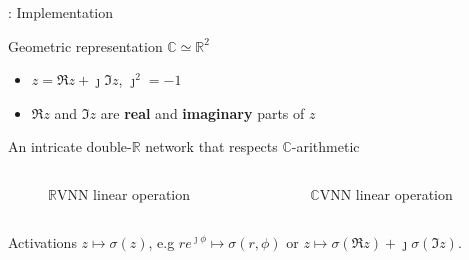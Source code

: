 \documentclass{beamer}
\newcommand{\real}{\mathbb{R}}
\newcommand{\cplx}{\mathbb{C}}
\newcommand{\iu}{{\jmath}}
\begin{document}
\begin{frame}[c]{\insertsection: Implementation}

  Geometric representation $\cplx \simeq \real^2$
  \begin{itemize}
    \item $z = \Re{z} + \iu \Im{z}$, $\iu^2 = -1$
    \item $\Re{z}$ and $\Im{z}$ are \textbf{real} and \textbf{imaginary} parts of $z$
  \end{itemize}

  \bigskip

  \bigskip
  An intricate double-$\real$ network that respects $\cplx$-arithmetic
  \vspace{-1em}
  \begin{columns}[T]
    \begin{column}{0.45\linewidth}
      \begin{figure}
          
        {$\real$VNN linear operation}
      \end{figure}
    \end{column}%
    \begin{column}{0.45\linewidth}
      \begin{figure}
          
        {$\cplx$VNN linear operation}
      \end{figure}
    \end{column}
  \end{columns}

  \bigskip

  \bigskip
  Activations $z \mapsto \sigma(z)$, e.g $
    r e^{\iu \phi} \mapsto \sigma(r, \phi)
  $ or $
    z \mapsto \sigma(\Re{z}) + \iu \sigma(\Im{z}) %
  $.


\end{frame}
\end{document}
